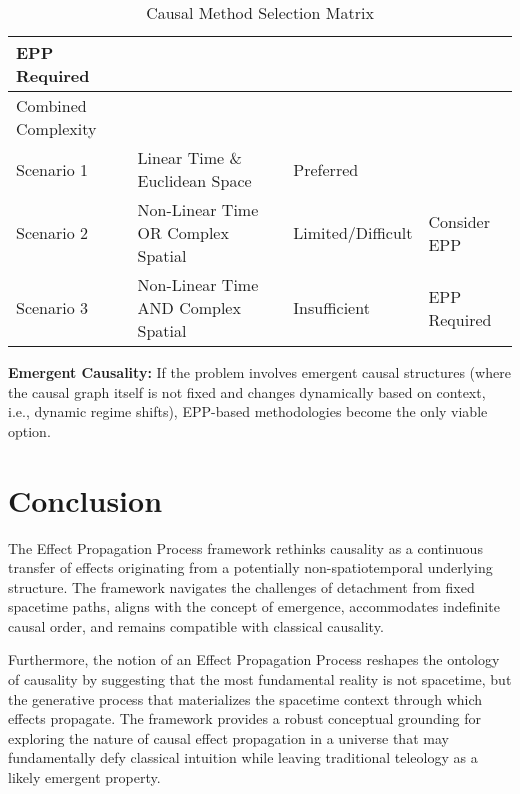 \documentclass{article}
\begin{document}
\begin{table}[hb]
\begin{tabular}{llll}
  \multicolumn{1}{l|}{EPP Required} \\ \hline
\multicolumn{1}{|l|}{Combined Complexity} &
  \multicolumn{1}{l|}{} &
  \multicolumn{1}{l|}{} &
  \multicolumn{1}{l|}{} \\ \hline
\multicolumn{1}{|l|}{Scenario 1} &
  \multicolumn{1}{l|}{Linear Time \& Euclidean Space} &
  \multicolumn{1}{l|}{Preferred} &
  \multicolumn{1}{l|}{} \\ \hline
\multicolumn{1}{|l|}{Scenario 2} &
  \multicolumn{1}{l|}{Non-Linear Time OR Complex Spatial} &
  \multicolumn{1}{l|}{Limited/Difficult} &
  \multicolumn{1}{l|}{Consider EPP} \\ \hline
\multicolumn{1}{|l|}{Scenario 3} &
  \multicolumn{1}{l|}{Non-Linear Time AND Complex Spatial} &
  \multicolumn{1}{l|}{Insufficient} &
  \multicolumn{1}{l|}{EPP Required} \\ \hline
\end{tabular}
\caption{Causal Method Selection Matrix}
\label{tab:method_matrix}
\end{table}

\textbf{Emergent Causality:} If the problem involves emergent causal structures (where the causal graph itself is not fixed and changes dynamically based on context, i.e., dynamic regime shifts), EPP-based methodologies become the only viable option.

\newpage

\section{Conclusion}
\label{sec:conclusion}

The Effect Propagation Process framework rethinks causality as a continuous transfer of effects originating from a potentially non-spatiotemporal underlying structure. The framework navigates the challenges of detachment from fixed spacetime paths, aligns with the concept of emergence, accommodates indefinite causal order, and remains compatible with classical causality.

Furthermore, the notion of an Effect Propagation Process reshapes the ontology of causality by suggesting that the most fundamental reality is not spacetime, but the generative process that materializes the spacetime context through which effects propagate. The framework provides a robust conceptual grounding for exploring the nature of causal effect propagation in a universe that may fundamentally defy classical intuition while leaving traditional teleology as a likely emergent property.
\end{document}
